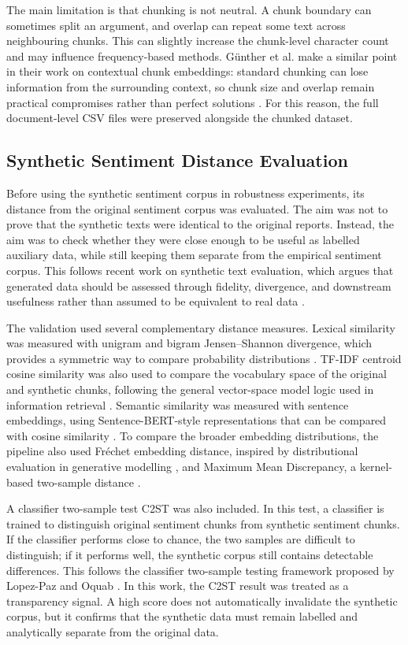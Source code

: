 \documentclass{article}
\begin{document}
The main limitation is that chunking is not neutral. A chunk boundary can sometimes
split an argument, and overlap can repeat some text across neighbouring chunks. This
can slightly increase the chunk-level character count and may influence
frequency-based methods. G{\"u}nther et al. make a similar point in their work on
contextual chunk embeddings: standard chunking can lose information from the
surrounding context, so chunk size and overlap remain practical compromises rather
than perfect solutions \cite{gunther2024latechunking}. For this reason, the full
document-level CSV files were preserved alongside the chunked dataset.

\subsection{Synthetic Sentiment Distance Evaluation}

Before using the synthetic sentiment corpus in robustness experiments, its distance
from the original sentiment corpus was evaluated. The aim was not to prove that the
synthetic texts were identical to the original reports. Instead, the aim was to check
whether they were close enough to be useful as labelled auxiliary data, while still
keeping them separate from the empirical sentiment corpus. This follows recent work
on synthetic text evaluation, which argues that generated data should be assessed
through fidelity, divergence, and downstream usefulness rather than assumed to be
equivalent to real data \cite{chim2025evaluating,tari2026privacy}.

The validation used several complementary distance measures. Lexical similarity was
measured with unigram and bigram Jensen--Shannon divergence, which provides a
symmetric way to compare probability distributions \cite{endres2003new}. TF-IDF
centroid cosine similarity was also used to compare the vocabulary space of the
original and synthetic chunks, following the general vector-space model logic used in
information retrieval \cite{salton1988term}. Semantic similarity was measured with
sentence embeddings, using Sentence-BERT-style representations that can be compared
with cosine similarity \cite{reimers2019sentence}. To compare the broader embedding
distributions, the pipeline also used Fréchet embedding distance, inspired by
distributional evaluation in generative modelling \cite{heusel2017gans}, and Maximum
Mean Discrepancy, a kernel-based two-sample distance \cite{gretton2012kernel}.

A classifier two-sample test C2ST was also included. In this test, a classifier is
trained to distinguish original sentiment chunks from synthetic sentiment chunks. If
the classifier performs close to chance, the two samples are difficult to
distinguish; if it performs well, the synthetic corpus still contains detectable
differences. This follows the classifier two-sample testing framework proposed by
Lopez-Paz and Oquab \cite{lopez2016revisiting}. In this work, the C2ST result was
treated as a transparency signal. A high score does not automatically invalidate the
synthetic corpus, but it confirms that the synthetic data must remain labelled and
analytically separate from the original data.
\end{document}
